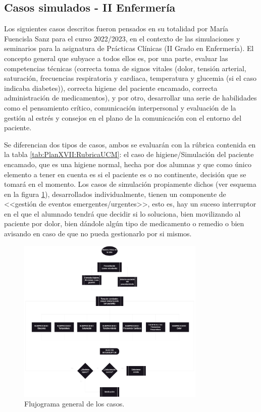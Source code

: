 \subsection{Casos simulados - II Enfermería}
Los siguientes casos descritos fueron pensados en su totalidad por María Fuencisla Sanz para el curso 2022/2023, en el contexto de las simulaciones y seminarios para la asignatura de Prácticas Clínicas (II Grado en Enfermería). El concepto general que subyace a todos ellos es, por una parte, evaluar las competencias técnicas (correcta toma de signos vitales (dolor, tensión arterial, saturación, frecuencias respiratoria y cardiaca, temperatura y glucemia (si el caso indicaba diabetes)), correcta higiene del paciente encamado, correcta administración de medicamentos), y por otro, desarrollar una serie de habilidades como el pensamiento crítico, comunicación interpersonal y evaluación de la gestión al estrés y consejos en el plano de la comunicación con el entorno del paciente.

Se diferencian dos tipos de casos, ambos se evaluarán con la rúbrica contenida en la tabla \ref{tab:PlanXVII:RubricaUCM}: el caso de higiene/Simulación del paciente encamado, que es una higiene normal, hecha por dos alumnas y que como único elemento a tener en cuenta es si el paciente es o no continente, decisión que se tomará en el momento. Los casos de simulación propiamente dichos (ver esquema en la figura \ref{fig:PlanXVII:FlujogramaGeneral}), desarrollados individualmente, tienen un componente de <<gestión de eventos emergentes/urgentes>>, esto es, hay un suceso interruptor en el que el alumnado tendrá que decidir si lo soluciona, bien movilizando al paciente por dolor, bien dándole algún tipo de medicamento o remedio o bien avisando en caso de que no pueda gestionarlo por si mismos. 

\begin{figure}[H]
    \centering
	\includegraphics[width=0.8\textwidth]{./imagenes/ACV-AdSC-CasosIIEnfermeria-ResolucionGeneral.png}
	\caption{\label{fig:PlanXVII:FlujogramaGeneral}Flujograma general de los casos.}
\end{figure}


